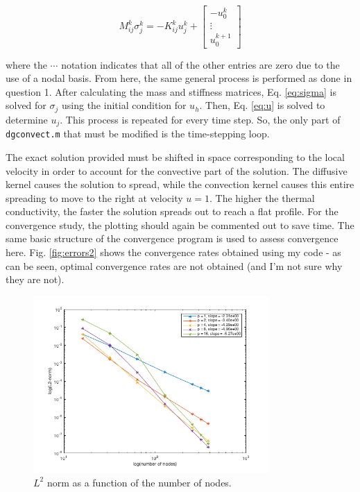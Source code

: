 \documentclass[10pt]{article}
\newcommand{\beq}{\begin{equation}}
\newcommand{\eeq}{\end{equation}}
\begin{document}
\beq
\label{eq:sigma}
M_{ij}^k\sigma_j^k=-K_{ij}^ku_j^k+\begin{bmatrix}-u_0^k\\\vdots\\u_0^{k+1}\end{bmatrix}
\eeq

where the \(\cdots\) notation indicates that all of the other entries are zero due to the use of a nodal basis. From here, the same general process is performed as done in question 1. After calculating the mass and stiffness matrices, Eq. \eqref{eq:sigma} is solved for \(\sigma_j\) using the initial condition for \(u_h\). Then, Eq. \eqref{eq:u} is solved to determine \(u_j\). This process is repeated for every time step. So, the only part of {\tt dgconvect.m} that must be modified is the time-stepping loop.

The exact solution provided must be shifted in space corresponding to the local velocity in order to account for the convective part of the solution. The diffusive kernel causes the solution to spread, while the convection kernel causes this entire spreading to move to the right at velocity \(u=1\). The higher the thermal conductivity, the faster the solution spreads out to reach a flat profile. For the convergence study, the plotting should again be commented out to save time. The same basic structure of the convergence program is used to assess convergence here. Fig. \ref{fig:errors2} shows the convergence rates obtained using my code - as can be seen, optimal convergence rates are not obtained (and I'm not sure why they are not). 

\begin{figure}[H]
\centering
\includegraphics[width=0.8\textwidth]{figures/error2_raw.png}
\caption{\(L^2\) norm as a function of the number of nodes.}
\label{fig:errors2_raw}
\end{figure}
\end{document}
